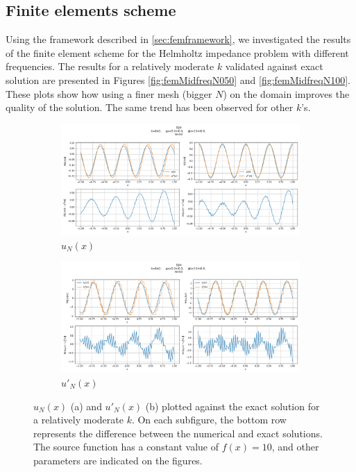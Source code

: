 \subsection{Finite elements scheme}\label{sec:femresults}
Using the framework described in \autoref{sec:femframework}, we investigated the results of the finite element scheme
for the Helmholtz impedance problem with different frequencies. The results for a relatively moderate $k$  validated
against exact solution are presented in Figures \ref{fig:femMidfreqN050} and \ref{fig:femMidfreqN100}. These plots show how using a finer mesh (bigger $N$)
on the domain improves the quality of the solution. The same trend has been observed for other $k$'s.

\begin{figure}[h]
    \label{fig:femMidfreqN050}
    \centering
    \begin{subfigure}[b]{0.9\textwidth}
        \includegraphics[width=\textwidth]{img/FEM-Const-MidFreq-N0050-sol.png}
        \caption{$u_N(x)$}
    \end{subfigure}
    \vfill
    \begin{subfigure}[b]{0.9\textwidth}
        \includegraphics[width=\textwidth]{img/FEM-Const-MidFreq-N0050-der.png}
        \caption{$u'_N(x)$}
    \end{subfigure}
    \caption{$u_N(x)$ (a) and $u'_N(x)$ (b) plotted against the exact solution for a relatively moderate $k$.
    On each subfigure, the bottom row represents the difference between the numerical and exact solutions. The source
    function has a constant value of $f(x)=10$, and other parameters are indicated on the figures.}
\end{figure}
